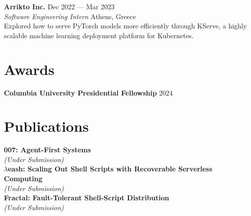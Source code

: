 \documentclass[margin, 12pt]{resume}
\newcommand{\cvName}{Nikos Pagonas}
\newcommand{\sectionVSpace}{\vspace{-3.5ex}} %
\newcommand{\authors}[1]{#1\xspace}
\newcommand{\equalContributionNote}{(*equal contribution)\xspace}
\newcommand{\fellowship}[1]{\textbf{#1}\xspace}
\newcommand{\institution}[1]{\textbf{#1}\xspace}
\newcommand{\interval}[2]{#1 --- #2\xspace}
\newcommand{\ordinal}[1]{\textsuperscript{#1}\xspace}
\newcommand{\rSection}[1]{\sectionVSpace\section{#1}\xspace}
\newcommand{\paperTitle}[1]{\textbf{#1}\xspace}
\newcommand{\place}[1]{#1\xspace}
\newcommand{\role}[1]{\textit{#1}\xspace}
\newcommand{\stitle}[1]{#1:\xspace}
\newcommand{\underSubmission}{\textit{(Under Submission)}\xspace}
\newcommand{\venue}[1]{\textit{#1}\xspace}
\begin{document}
\begin{resume}

    \institution{Arrikto Inc.} \hfill \interval{Dec 2022}{Mar 2023} \\
    \role{Software Engineering Intern} \hfill \place{Athens, Greece} \\
    Explored how to serve PyTorch models more efficiently through KServe, a highly scalable machine learning deployment platform for Kubernetes. \\

    \rSection{Awards}

    \fellowship{Columbia University Presidential Fellowship} \hfill 2024 \\

    \rSection{Publications}

    \newcommand{\me}{\textbf{\cvName}\xspace}

    \paperTitle{007: Agent-First Systems} \\
    \underSubmission \\

    \paperTitle{\( \lambda \)eash: Scaling Out Shell Scripts with Recoverable Serverless Computing} \\
    \underSubmission \\

    \paperTitle{Fractal: Fault-Tolerant Shell-Script Distribution} \\
    \underSubmission \\


\end{resume}
\end{document}
